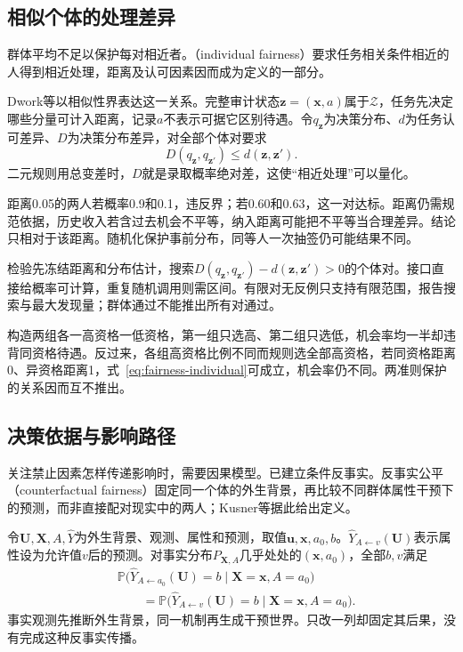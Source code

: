 \subsection{相似个体的处理差异}
\label{sec:fairness-individual-comparison}

群体平均不足以保护每对相近者。（individual fairness）要求任务相关条件相近的人得到相近处理，距离及认可因素因而成为定义的一部分。

Dwork等以相似性界表达这一关系。完整审计状态$\bm z=(\bm x,a)$属于$\mathcal Z$，任务先决定哪些分量可计入距离，记录$a$不表示可据它区别待遇。令$q_{\bm z}$为决策分布、$d$为任务认可差异、$D$为决策分布差异，对全部个体对要求
\begin{equation}
 D(q_{\bm z},q_{\bm z'})\leq d(\bm z,\bm z').
 \label{eq:fairness-individual}
\end{equation}
二元规则用总变差时，$D$就是录取概率绝对差，这使“相近处理”可以量化。

距离0.05的两人若概率0.9和0.1，违反界；若0.60和0.63，这一对达标。距离仍需规范依据，历史收入若含过去机会不平等，纳入距离可能把不平等当合理差异。结论只相对于该距离。随机化保护事前分布，同等人一次抽签仍可能结果不同。

检验先冻结距离和分布估计，搜索$D(q_{\bm z},q_{\bm z'})-d(\bm z,\bm z')>0$的个体对。接口直接给概率可计算，重复随机调用则需区间。有限对无反例只支持有限范围，报告搜索与最大发现量；群体通过不能推出所有对通过。

构造两组各一高资格一低资格，第一组只选高、第二组只选低，机会率均一半却违背同资格待遇。反过来，各组高资格比例不同而规则选全部高资格，若同资格距离0、异资格距离1，式~\eqref{eq:fairness-individual}可成立，机会率仍不同。两准则保护的关系因而互不推出。

\subsection{决策依据与影响路径}
\label{sec:fairness-counterfactual-comparison}

关注禁止因素怎样传递影响时，需要因果模型。已建立条件反事实。反事实公平（counterfactual fairness）固定同一个体的外生背景，再比较不同群体属性干预下的预测，而非直接配对现实中的两人；Kusner等据此给出定义。

令$\bm U,\bm X,A,\hat Y$为外生背景、观测、属性和预测，取值$\bm u,\bm x,a_0,b$。$\hat Y_{A\leftarrow v}(\bm U)$表示属性设为允许值$v$后的预测。对事实分布$P_{\bm X,A}$几乎处处的$(\bm{x},a_0)$，全部$b,v$满足
\begin{equation}
\begin{aligned}
 &\mathbb P\bigl(\hat Y_{A\leftarrow a_0}(\bm U)=b
       \mid\bm X=\bm x,A=a_0\bigr)\\
 &\qquad=\mathbb P\bigl(\hat Y_{A\leftarrow v}(\bm U)=b
       \mid\bm X=\bm x,A=a_0\bigr).
\end{aligned}
 \label{eq:fairness-counterfactual}
\end{equation}
事实观测先推断外生背景，同一机制再生成干预世界。只改一列却固定其后果，没有完成这种反事实传播。


